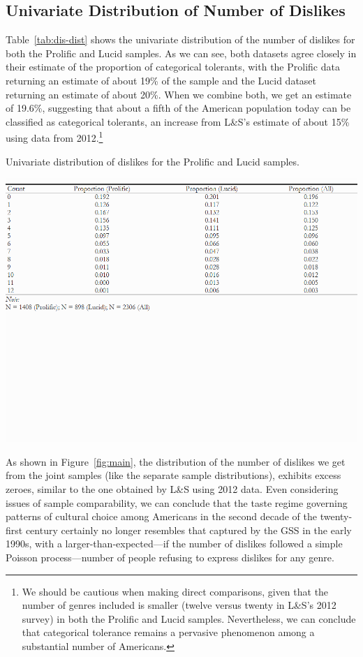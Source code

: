 \documentclass[12pt]{article}
\begin{document}
\subsection*{Univariate Distribution of Number of Dislikes}
Table~\ref{tab:dis-dist} shows the univariate distribution of the number of dislikes for both the Prolific and Lucid samples. As we can see, both datasets agree closely in their estimate of the proportion of categorical tolerants, with the Prolific data returning an estimate of about 19\% of the sample and the Lucid dataset returning an estimate of about 20\%. When we combine both, we get an estimate of 19.6\%, suggesting that about a fifth of the American population today can be classified as categorical tolerants, an increase from L\&S's estimate of about 15\% using data from 2012.\footnote{We should be cautious when making direct comparisons, given that the number of genres included is smaller (twelve versus twenty in L\&S's 2012 survey) in both the Prolific and Lucid samples. Nevertheless, we can conclude that categorical tolerance remains a pervasive phenomenon among a substantial number of Americans.} 

\begin{table}[ht!]
    \caption{Univariate distribution of dislikes for the Prolific and Lucid samples.}
    \includegraphics[trim={0 9.5cm 0 0},clip, width=1.0\textwidth]{Tabs/desc-tab-dislike-dist.png}
    \label{tab:dis-dist}
\end{table}

As shown in Figure~\ref{fig:main}, the distribution of the number of dislikes we get from the joint samples (like the separate sample distributions), exhibits excess zeroes, similar to the one obtained by L\&S using 2012 data. Even considering issues of sample comparability, we can conclude that the taste regime governing patterns of cultural choice among Americans in the second decade of the twenty-first century certainly no longer resembles that captured by the GSS in the early 1990s, with a larger-than-expected---if the number of dislikes followed a simple Poisson process---number of people refusing to express dislikes for any genre. 
\end{document}
